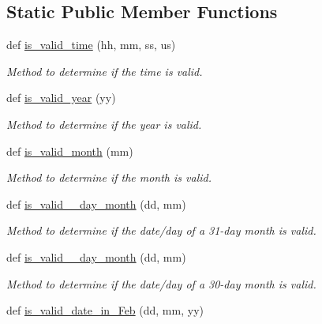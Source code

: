 \subsection*{Static Public Member Functions}
\begin{DoxyCompactItemize}
\item 
def \hyperlink{classutilities_1_1date__time__processing_1_1date__time__operations_aaa8f94503a00886b6ca54e79c5ac2e84}{is\+\_\+valid\+\_\+time} (hh, mm, ss, us)
\begin{DoxyCompactList}\small\item\em Method to determine if the time is valid. \end{DoxyCompactList}\item 
def \hyperlink{classutilities_1_1date__time__processing_1_1date__time__operations_a621d736cda0d00786c1e8803cf7fc768}{is\+\_\+valid\+\_\+year} (yy)
\begin{DoxyCompactList}\small\item\em Method to determine if the year is valid. \end{DoxyCompactList}\item 
def \hyperlink{classutilities_1_1date__time__processing_1_1date__time__operations_a7ca9f5b1f8592678a4485eb1b9618917}{is\+\_\+valid\+\_\+month} (mm)
\begin{DoxyCompactList}\small\item\em Method to determine if the month is valid. \end{DoxyCompactList}\item 
def \hyperlink{classutilities_1_1date__time__processing_1_1date__time__operations_a4cef78f32520246407763e39a5b090ab}{is\+\_\+valid\+\_\+\_\+day\+\_\+month} (dd, mm)
\begin{DoxyCompactList}\small\item\em Method to determine if the date/day of a 31-\/day month is valid. \end{DoxyCompactList}\item 
def \hyperlink{classutilities_1_1date__time__processing_1_1date__time__operations_a15c6ea3d519b1665781fd9dcddec04a6}{is\+\_\+valid\+\_\+\_\+day\+\_\+month} (dd, mm)
\begin{DoxyCompactList}\small\item\em Method to determine if the date/day of a 30-\/day month is valid. \end{DoxyCompactList}\item 
def \hyperlink{classutilities_1_1date__time__processing_1_1date__time__operations_a659b5810ce55e7bbb18820664ef97d83}{is\+\_\+valid\+\_\+date\+\_\+in\+\_\+\+Feb} (dd, mm, yy)

\end{DoxyCompactItemize}
